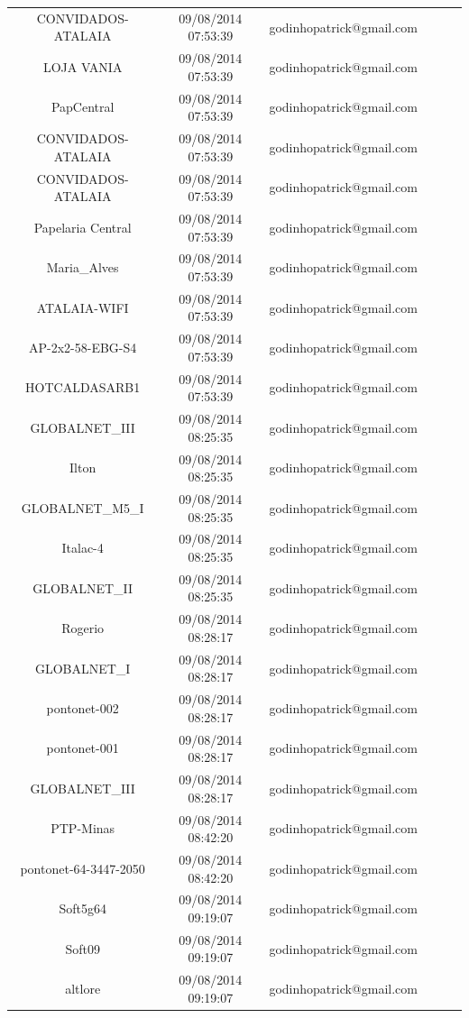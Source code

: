 \documentclass[12pt, %
openright, 
oneside,
a4paper,
brazil]{facom-ufu-abntex2}
\begin{document}
\begin{center}
\begin{longtable}{|c|c|c|c|c|c|}
CONVIDADOS-ATALAIA                & 09/08/2014 07:53:39 & godinhopatrick@gmail.com \\
LOJA VANIA                        & 09/08/2014 07:53:39 & godinhopatrick@gmail.com \\
PapCentral                        & 09/08/2014 07:53:39 & godinhopatrick@gmail.com \\
CONVIDADOS-ATALAIA                & 09/08/2014 07:53:39 & godinhopatrick@gmail.com \\
CONVIDADOS-ATALAIA                & 09/08/2014 07:53:39 & godinhopatrick@gmail.com \\
Papelaria Central                 & 09/08/2014 07:53:39 & godinhopatrick@gmail.com \\
Maria\_Alves                      & 09/08/2014 07:53:39 & godinhopatrick@gmail.com \\
ATALAIA-WIFI                      & 09/08/2014 07:53:39 & godinhopatrick@gmail.com \\
AP-2x2-58-EBG-S4                  & 09/08/2014 07:53:39 & godinhopatrick@gmail.com \\
HOTCALDASARB1                     & 09/08/2014 07:53:39 & godinhopatrick@gmail.com \\
GLOBALNET\_III                    & 09/08/2014 08:25:35 & godinhopatrick@gmail.com \\
Ilton                             & 09/08/2014 08:25:35 & godinhopatrick@gmail.com \\
GLOBALNET\_M5\_I                  & 09/08/2014 08:25:35 & godinhopatrick@gmail.com \\
Italac-4                          & 09/08/2014 08:25:35 & godinhopatrick@gmail.com \\
GLOBALNET\_II                     & 09/08/2014 08:25:35 & godinhopatrick@gmail.com \\
Rogerio                           & 09/08/2014 08:28:17 & godinhopatrick@gmail.com \\
GLOBALNET\_I                      & 09/08/2014 08:28:17 & godinhopatrick@gmail.com \\
pontonet-002                      & 09/08/2014 08:28:17 & godinhopatrick@gmail.com \\
pontonet-001                      & 09/08/2014 08:28:17 & godinhopatrick@gmail.com \\
GLOBALNET\_III                    & 09/08/2014 08:28:17 & godinhopatrick@gmail.com \\
PTP-Minas                         & 09/08/2014 08:42:20 & godinhopatrick@gmail.com \\
pontonet-64-3447-2050             & 09/08/2014 08:42:20 & godinhopatrick@gmail.com \\
Soft5g64                          & 09/08/2014 09:19:07 & godinhopatrick@gmail.com \\
Soft09                            & 09/08/2014 09:19:07 & godinhopatrick@gmail.com \\
altlore                           & 09/08/2014 09:19:07 & godinhopatrick@gmail.com
\end{longtable}
\end{center}
\end{document}

